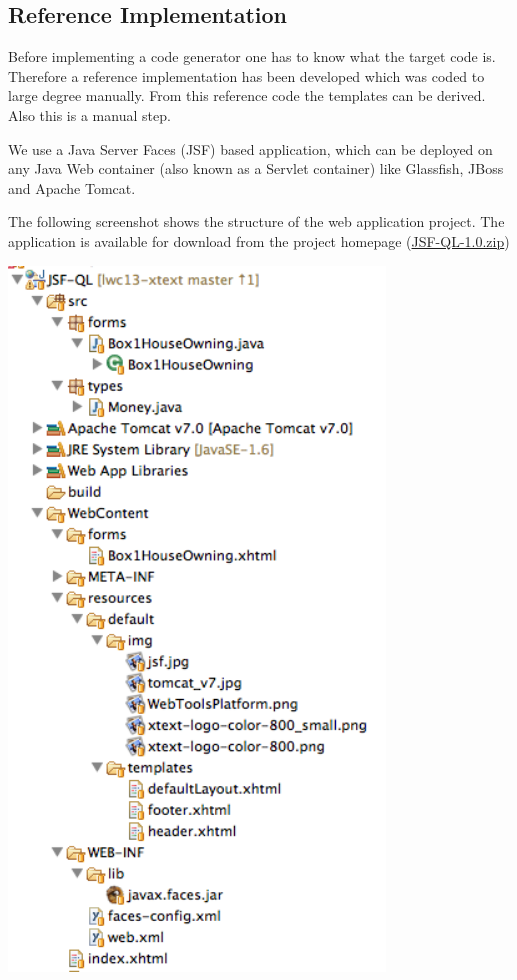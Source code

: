 \subsection{Reference Implementation}

Before implementing a code generator one has to know what the target code is. Therefore a reference implementation has been
developed which was coded to large degree manually. From this reference code the templates can be derived. Also this is a
manual step.

We use a Java Server Faces (JSF) based application, which can be deployed on any
Java Web container (also known as a Servlet container) like Glassfish, JBoss and Apache Tomcat.

The following screenshot shows the structure of the web application project. The application is available for download from the project 
homepage (\href{http://lwc13-xtext.eclipselabs.org.codespot.com/files/JSF-QL-1.0.zip}{JSF-QL-1.0.zip})

\includegraphics[width=10cm]{./images/chapter02/referenceimpl_projecttree.png}

